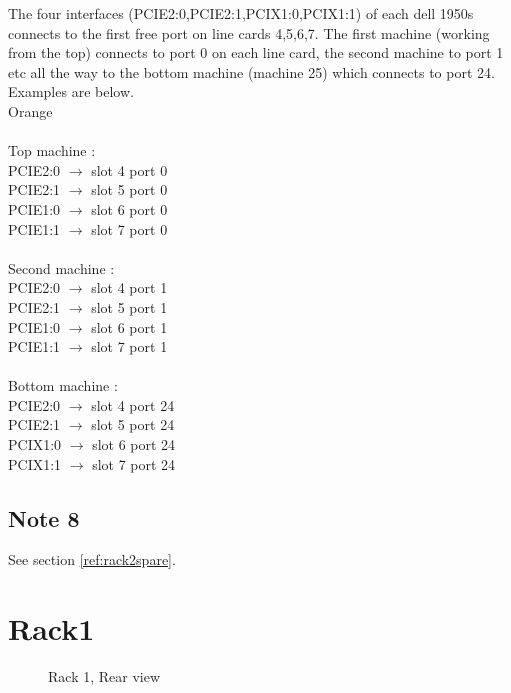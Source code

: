 \documentclass[a4paper]{article}
\begin{document}
The four interfaces (PCIE2:0,PCIE2:1,PCIX1:0,PCIX1:1) of each dell 1950s connects
to the first free port on line cards 4,5,6,7. The first machine
(working from the top) connects to port 0 on each line card, the
second machine to port 1 etc all the way to the bottom machine
(machine 25) which connects to port 24. Examples are below. 
\\
Orange\\
\\
Top machine :\\
PCIE2:0 $\rightarrow$ slot 4 port 0\\
PCIE2:1 $\rightarrow$ slot 5 port 0\\
PCIE1:0 $\rightarrow$ slot 6 port 0\\
PCIE1:1 $\rightarrow$ slot 7 port 0\\
\\
Second machine :\\
PCIE2:0 $\rightarrow$ slot 4 port 1\\
PCIE2:1 $\rightarrow$ slot 5 port 1\\
PCIE1:0 $\rightarrow$ slot 6 port 1\\
PCIE1:1 $\rightarrow$ slot 7 port 1\\
\\
Bottom machine :\\
PCIE2:0 $\rightarrow$ slot 4 port 24\\
PCIE2:1 $\rightarrow$ slot 5 port 24\\
PCIX1:0 $\rightarrow$ slot 6 port 24\\
PCIX1:1 $\rightarrow$ slot 7 port 24\\

\subsection{Note 8}

See section \ref{ref:rack2spare}.

\newpage

\section{Rack1}

\begin{figure}[h!]
\begin{center}
\caption{Rack 1, Rear view}
\label{fig:Rack1}
\end{center}
\end{figure}
\end{document}
